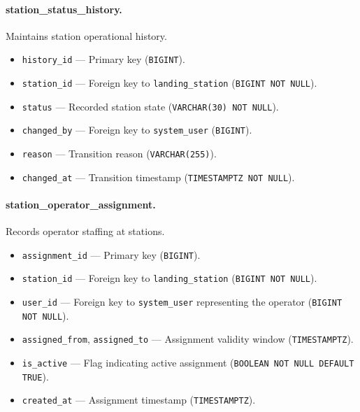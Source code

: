 \paragraph{station\_status\_history.}
Maintains station operational history.
\begin{itemize}
    \item \texttt{history\_id} — Primary key (\texttt{BIGINT}).
    \item \texttt{station\_id} — Foreign key to \texttt{landing\_station} (\texttt{BIGINT NOT NULL}).
    \item \texttt{status} — Recorded station state (\texttt{VARCHAR(30) NOT NULL}).
    \item \texttt{changed\_by} — Foreign key to \texttt{system\_user} (\texttt{BIGINT}).
    \item \texttt{reason} — Transition reason (\texttt{VARCHAR(255)}).
    \item \texttt{changed\_at} — Transition timestamp (\texttt{TIMESTAMPTZ NOT NULL}).
\end{itemize}

\paragraph{station\_operator\_assignment.}
Records operator staffing at stations.
\begin{itemize}
    \item \texttt{assignment\_id} — Primary key (\texttt{BIGINT}).
    \item \texttt{station\_id} — Foreign key to \texttt{landing\_station} (\texttt{BIGINT NOT NULL}).
    \item \texttt{user\_id} — Foreign key to \texttt{system\_user} representing the operator (\texttt{BIGINT NOT NULL}).
    \item \texttt{assigned\_from}, \texttt{assigned\_to} — Assignment validity window (\texttt{TIMESTAMPTZ}).
    \item \texttt{is\_active} — Flag indicating active assignment (\texttt{BOOLEAN NOT NULL DEFAULT TRUE}).
    \item \texttt{created\_at} — Assignment timestamp (\texttt{TIMESTAMPTZ}).
\end{itemize}

